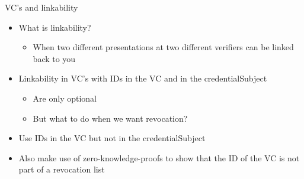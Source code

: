 \documentclass[
	english,%
	authorontitle=true,
	]{bfhbeamer}
\begin{document}
\begin{frame}{VC's and linkability}
    \begin{itemize}
        \item What is linkability?
        \begin{itemize}
            \item When two different presentations at two different verifiers can be linked back to you
        \end{itemize}
        \item Linkability in VC's with IDs in the VC and in the credentialSubject
        \begin{itemize}
            \item Are only optional
            \item But what to do when we want revocation?
        \end{itemize}\vfill
        \item Use IDs in the VC but not in the credentialSubject
        \item Also make use of zero-knowledge-proofs to show that the ID of the VC is not part of a revocation list
    \end{itemize}
\end{frame}




\end{document}
